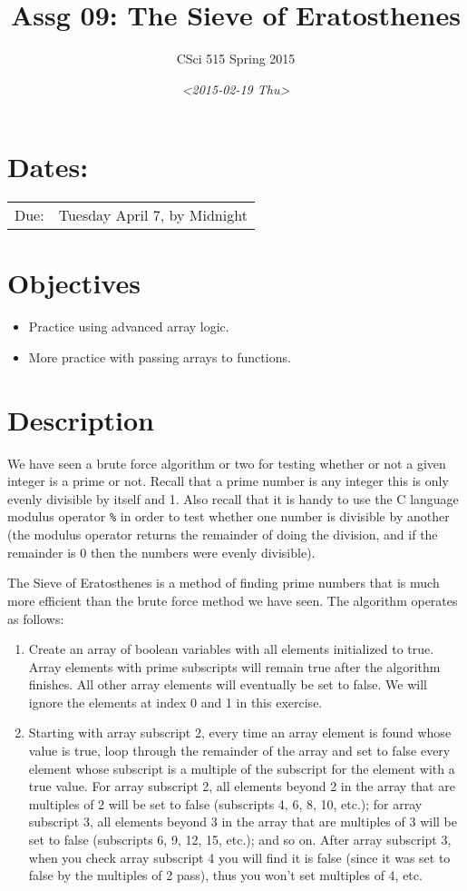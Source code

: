 \documentclass[11pt]{article}
\author{CSci 515 Spring 2015}
\date{\textit{<2015-02-19 Thu>}}
\title{Assg 09: The Sieve of Eratosthenes}
\begin{document}
\maketitle

\section*{Dates:}
\label{sec-1}
\begin{center}
\begin{tabular}{ll}
Due: & Tuesday April 7, by Midnight\\
\end{tabular}
\end{center}
\section*{Objectives}
\label{sec-2}
\begin{itemize}
\item Practice using advanced array logic.
\item More practice with passing arrays to functions.
\end{itemize}
\section*{Description}
\label{sec-3}
We have seen a brute force algorithm or two for testing whether or not
a given integer is a prime or not.  Recall that a prime number is any
integer this is only evenly divisible by itself and 1.  Also recall
that it is handy to use the C language modulus operator \verb~%~ in order
to test whether one number is divisible by another (the modulus
operator returns the remainder of doing the division, and if the
remainder is 0 then the numbers were evenly divisible).

The Sieve of Eratosthenes is a method of finding prime numbers that
is much more efficient than the brute force method we have seen.
The algorithm operates as follows:

\begin{enumerate}
\item Create an array of boolean variables with all elements initialized
to true.  Array elements with prime subscripts will remain true
after the algorithm finishes.  All other array elements will
eventually be set to false.  We will ignore the elements at index 0
and 1 in this exercise.
\item Starting with array subscript 2, every time an array element is
found whose value is true, loop through the remainder of the array
and set to false every element whose subscript is a multiple of the
subscript for the element with a true value.  For array subscript
2, all elements beyond 2 in the array that are multiples of 2 will
be set to false (subscripts 4, 6, 8, 10, etc.); for array subscript 
3, all elements beyond 3 in the array that are multiples of 3 will be
set to false (subscripts 6, 9, 12, 15, etc.); and so on.  After
array subscript 3, when you check array subscript 4 you will find it
is false (since it was set to false by the multiples of 2 pass), thus
you won't set multiples of 4, etc.
\end{enumerate}
\end{document}
